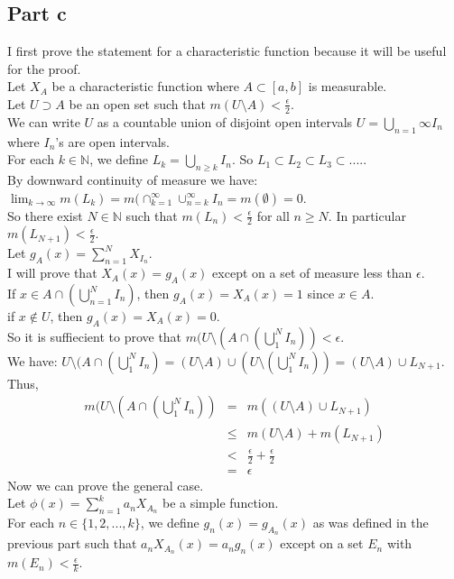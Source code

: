 \documentclass[12pt]{article}
\begin{document}
\subsection*{Part c}
I first prove the statement for a characteristic function because it will be useful for the proof.
\\
Let $X_A$ be a characteristic function where $A \subset [a,b]$ is measurable. \\
Let $U \supset A$ be an open set such that 
$m(U \setminus A) < \frac{\epsilon}{2}$. \\
We can write $U$ as a countable union of disjoint open intervals $U=\bigcup_{n=1}{\infty} I_n$ where $I_n$'s are open intervals. \\
For each $k \in \mathbb{N}$, we define $L_k = \bigcup_{n \ge k} I_n$. So $L_1 \subset L_2 \subset L_3 \subset ....$. \\
By downward continuity of measure we have:
$\lim_{k \rightarrow \infty} m(L_k)=m(\cap_{k=1}^{\infty} \cup_{n=k}^{\infty} I_n=m(\emptyset)=0$.
\\
So there exist $N \in \mathbb{N}$ such that $m(L_n) < \frac{\epsilon}{2}$ for all $n \ge N$. In particular
$m(L_{N+1}) < \frac{\epsilon}{2}$. \\
Let $g_A(x)=\sum_{n=1}^N X_{I_n}$.\\ 
I will prove that $X_A(x)=g_A(x)$ except on a set of measure less than $\epsilon$. \\
If $x \in A \cap (\bigcup_{n=1}^N I_n)$, then $g_A(x)=X_A(x)=1$ since $x \in A$. \\
if $x \not\in U$, then $g_A(x)=X_A(x)=0$.\\
So it is suffiecient to prove that 
$m(U\setminus(A \cap (\bigcup_1^N I_n)) < \epsilon$.
\\ 
We have: $U\setminus(A \cap (\bigcup_1^N I_n)=
(U\setminus A) \cup (U \setminus (\bigcup_1^N I_n))
=(U\setminus A) \cup L_{N+1}$.
Thus,
\begin{eqnarray*}
m(U\setminus(A \cap (\bigcup_1^N I_n))
&=&
m((U\setminus A) \cup L_{N+1})
\\ &\le &
m(U\setminus A)+m(L_{N+1})
\\ &< &
\frac{\epsilon}{2}+\frac{\epsilon}{2}
\\ &=&
\epsilon
\end{eqnarray*}
Now we can prove the general case. \\
Let $\phi(x) = \sum_{n=1}^k a_nX_{A_n}$ be a simple function. \\
For each $n \in \{1,2,...,k\}$, we define $g_n(x)=g_{A_n}(x)$ as was defined in the previous part such that $a_nX_{A_n}(x)=a_ng_n(x)$ except on a set $E_n$ with $m(E_n) < \frac{\epsilon}{k}$. \\
\end{document}
